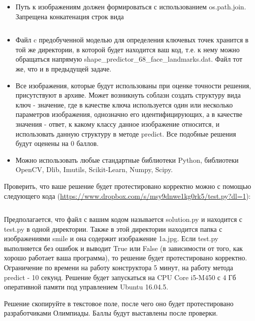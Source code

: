 \begin{itemize}
    \item Путь к изображениям должен формироваться с использованием os.path.join. Запрещена конкатенация строк вида
   
    \inputminted[fontsize=\footnotesize, linenos]{python}{2nd_tour/neuro/task_09/part_02.py}
    \item Файл c предобученной моделью для определения ключевых точек хранится в той же директории, в которой будет находится ваш код, т.е. к нему можно обращаться напрямую shape\_predictor\_68\_face\_landmarks.dat. Файл тот же, что и в предыдущей задаче.
    \item Все изображения, которые будут использованы при оценке точности решения, присутствуют в архиве. Может возникнуть соблазн создать структуру вида ключ - значение, где в качестве ключа используется один или несколько параметров изображения, однозначно его идентифицирующих, а в качестве значения - ответ, к какому классу данное изображение относится, и использовать данную структуру в методе predict. Все подобные решения будут оценены на 0 баллов.
    \item Можно использовать любые стандартные библиотеки Python, библиотеки OpenCV, Dlib, Imutils, Scikit-Learn, Numpy, Scipy.
\end{itemize}

Проверить, что ваше решение будет протестировано корректно можно с помощью следующего кода (\url{https://www.dropbox.com/s/msy9dnwe1kg0rk5/test.py?dl=1}):

\inputminted[fontsize=\footnotesize, linenos]{python}{2nd_tour/neuro/task_09/part_03.py}

Предполагается, что файл с вашим кодом называется solution.py и находится с test.py в одной директории. Также в этой директории находится папка с изображениями smile и она содержит изображение 1a.jpg. Если test.py выполняется без ошибок и выводит True или False (в зависимости от того, как хорошо работает ваша программа), то решение будет протестировано корректно.
Ограничение по времени на работу конструктора 5 минут, на работу метода predict - 10 секунд. Решение будет запускаться на CPU Core i5-M450 с 4 Гб оперативной памяти под управлением Ubuntu 16.04.5.

Решение скопируйте в текстовое поле, после чего оно будет протестировано разработчиками Олимпиады. Баллы будут выставлены после проверки.

